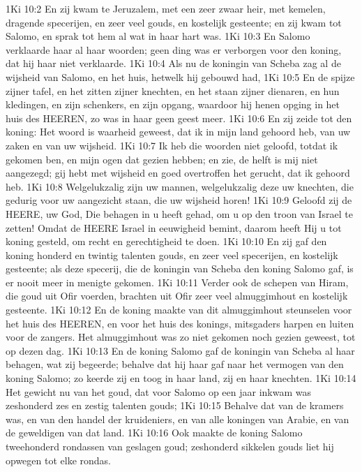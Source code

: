 1Ki 10:2  En zij kwam te Jeruzalem, met een zeer zwaar heir, met kemelen, dragende specerijen, en zeer veel gouds, en kostelijk gesteente; en zij kwam tot Salomo, en sprak tot hem al wat in haar hart was.
1Ki 10:3  En Salomo verklaarde haar al haar woorden; geen ding was er verborgen voor den koning, dat hij haar niet verklaarde.
1Ki 10:4  Als nu de koningin van Scheba zag al de wijsheid van Salomo, en het huis, hetwelk hij gebouwd had,
1Ki 10:5  En de spijze zijner tafel, en het zitten zijner knechten, en het staan zijner dienaren, en hun kledingen, en zijn schenkers, en zijn opgang, waardoor hij henen opging in het huis des HEEREN, zo was in haar geen geest meer.
1Ki 10:6  En zij zeide tot den koning: Het woord is waarheid geweest, dat ik in mijn land gehoord heb, van uw zaken en van uw wijsheid.
1Ki 10:7  Ik heb die woorden niet geloofd, totdat ik gekomen ben, en mijn ogen dat gezien hebben; en zie, de helft is mij niet aangezegd; gij hebt met wijsheid en goed overtroffen het gerucht, dat ik gehoord heb.
1Ki 10:8  Welgelukzalig zijn uw mannen, welgelukzalig deze uw knechten, die gedurig voor uw aangezicht staan, die uw wijsheid horen!
1Ki 10:9  Geloofd zij de HEERE, uw God, Die behagen in u heeft gehad, om u op den troon van Israel te zetten! Omdat de HEERE Israel in eeuwigheid bemint, daarom heeft Hij u tot koning gesteld, om recht en gerechtigheid te doen.
1Ki 10:10  En zij gaf den koning honderd en twintig talenten gouds, en zeer veel specerijen, en kostelijk gesteente; als deze specerij, die de koningin van Scheba den koning Salomo gaf, is er nooit meer in menigte gekomen.
1Ki 10:11  Verder ook de schepen van Hiram, die goud uit Ofir voerden, brachten uit Ofir zeer veel almuggimhout en kostelijk gesteente.
1Ki 10:12  En de koning maakte van dit almuggimhout steunselen voor het huis des HEEREN, en voor het huis des konings, mitsgaders harpen en luiten voor de zangers. Het almuggimhout was zo niet gekomen noch gezien geweest, tot op dezen dag.
1Ki 10:13  En de koning Salomo gaf de koningin van Scheba al haar behagen, wat zij begeerde; behalve dat hij haar gaf naar het vermogen van den koning Salomo; zo keerde zij en toog in haar land, zij en haar knechten.
1Ki 10:14  Het gewicht nu van het goud, dat voor Salomo op een jaar inkwam was zeshonderd zes en zestig talenten gouds;
1Ki 10:15  Behalve dat van de kramers was, en van den handel der kruideniers, en van alle koningen van Arabie, en van de geweldigen van dat land.
1Ki 10:16  Ook maakte de koning Salomo tweehonderd rondassen van geslagen goud; zeshonderd sikkelen gouds liet hij opwegen tot elke rondas.
